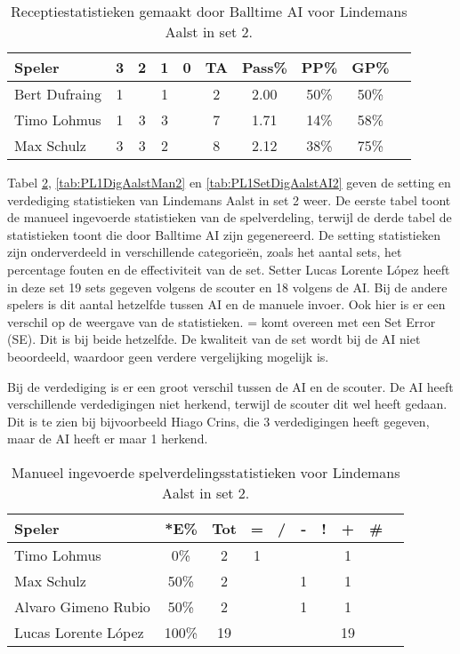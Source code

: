 \begin{table}[ht!]
  \centering
  \scriptsize
  \begin{tabular}{|l|c|c|c|c|c|c|c|c|c|} \hline
    \textbf{Speler} & 3 & 2 & 1 & 0 & TA & Pass\% & PP\% & GP\% \\ \hline
    Bert Dufraing & 1 &  & 1 &  & 2 & 2.00 & 50\% & 50\% \\
    Timo Lohmus & 1 & 3 & 3 &  & 7 & 1.71 & 14\% & 58\% \\
    Max Schulz & 3 & 3 & 2 &  & 8 & 2.12 & 38\% & 75\% \\  \hline
  \end{tabular}
  \caption[Receptiestatistieken gemaakt door Balltime AI voor Lindemans Aalst in set 2]{\label{tab:PL1ReceiveAalstAI2}Receptiestatistieken gemaakt door Balltime AI voor Lindemans Aalst in set 2.}
\end{table}

Tabel \ref{tab:PL1SetAalstMan2}, \ref{tab:PL1DigAalstMan2} en \ref{tab:PL1SetDigAalstAI2} geven de setting en verdediging statistieken van Lindemans Aalst in set 2 weer. De eerste tabel toont de manueel ingevoerde statistieken van de spelverdeling, terwijl de derde tabel de statistieken toont die door Balltime AI zijn gegenereerd. De setting statistieken zijn onderverdeeld in verschillende categorieën, zoals het aantal sets, het percentage fouten en de effectiviteit van de set. Setter Lucas Lorente López heeft in deze set 19 sets gegeven volgens de scouter en 18 volgens de AI. Bij de andere spelers is dit aantal hetzelfde tussen AI en de manuele invoer. Ook hier is er een verschil op de weergave van de statistieken. = komt overeen met een Set Error (SE). Dit is bij beide hetzelfde. De kwaliteit van de set wordt bij de AI niet beoordeeld, waardoor geen verdere vergelijking mogelijk is.

Bij de verdediging is er een groot verschil tussen de AI en de scouter. De AI heeft verschillende verdedigingen niet herkend, terwijl de scouter dit wel heeft gedaan. Dit is te zien bij bijvoorbeeld Hiago Crins, die 3 verdedigingen heeft gegeven, maar de AI heeft er maar 1 herkend.

\begin{table}[ht!]
  \centering
  \scriptsize
    \begin{tabular}{|l|c|c|c|c|c|c|c|c|c|} \hline
      \textbf{Speler} & *E\% & Tot & = & / & - & ! & + & \# \\ \hline
      Timo Lohmus & 0\% & 2 & 1 &  &  &  & 1 &   \\
      Max Schulz & 50\% & 2 &  &  & 1 & & 1 &  \\
      Alvaro Gimeno Rubio & 50\% & 2 &  &  & 1 &  & 1 &   \\ 
      Lucas Lorente López & 100\% & 19 &  &  &  &  & 19 &  \\ \hline
  \end{tabular}
  \caption[Manueel ingevoerde spelverdelingsstatistieken voor Lindemans Aalst in set 2]{\label{tab:PL1SetAalstMan2}Manueel ingevoerde spelverdelingsstatistieken voor Lindemans Aalst in set 2.}
\end{table}

